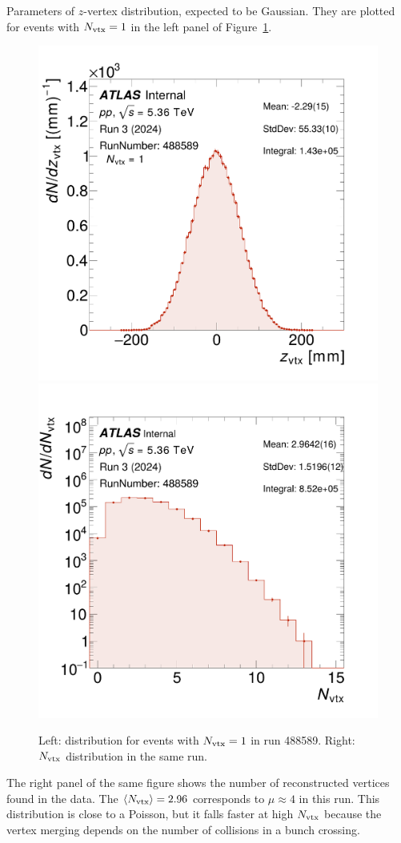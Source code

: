 Parameters of $z$-vertex distribution, expected to be Gaussian. 
They are plotted for events with $N_\text{vtx}=1$  in the left panel of Figure~\ref{fig:nvtx_ppref}. 
  \begin{figure}[h]
      \centering
      \includegraphics[width=0.45\linewidth]{images/vertex_z_488589.png}
      \includegraphics[width=0.45\linewidth]{images/nvertex_488589.png}
      \caption{Left: \zvtx distribution for events with $N_\text{vtx}=1$ in run 488589. Right: $N_\text{vtx}$ distribution in the same run.}
      \label{fig:nvtx_ppref}
  \end{figure}
The right panel of the same figure shows the number of reconstructed vertices found in the data. The $\langle N_\text{vtx} \rangle=2.96$ corresponds to $\mu\approx4$ in this run. This distribution is close to a Poisson, but it falls faster at high $N_\text{vtx}$ because the vertex merging depends on the number of collisions in a bunch crossing. 

